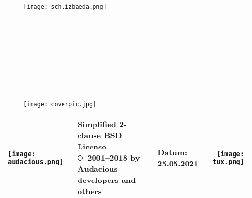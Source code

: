 %

\thispagestyle{empty} %
\begin{titlepage}
\vspace*{-3cm}
\begin{figure}[h]
\centering
\texttt{[image: schlizbaeda.png]}
\end{figure}

\begin{center}
\LARGE{\textbf{\Dokumentart}}\\[1.5ex] 
\Large{\Bezeichnung}\\[4ex]
\noindent\rule[1ex]{\textwidth}{3pt} %
\textbf{\titel}\\[1.5ex]             %
\noindent\rule[1ex]{\textwidth}{3pt} 
\\[2ex]

\normalsize
\textbf{\\}
\begin{figure}[h]
\centering
\texttt{[image: coverpic.jpg]}
\end{figure}

\begin{tabular}{lllr}\\
\hline
\parbox[c][50px]{0.10\textwidth}{\texttt{[image: audacious.png]}} & 
\parbox[c]{0.55\textwidth}{Simplified 2-clause BSD License\\ \copyright\ 2001--2018 by Audacious developers and others} &
\parbox[c]{0.15\textwidth}{Datum:\\25.05.2021} &
\parbox[c][50px]{0.10\textwidth}{\texttt{[image: tux.png]}}\\
\hline
\end{tabular}


\end{center}
\end{titlepage}
